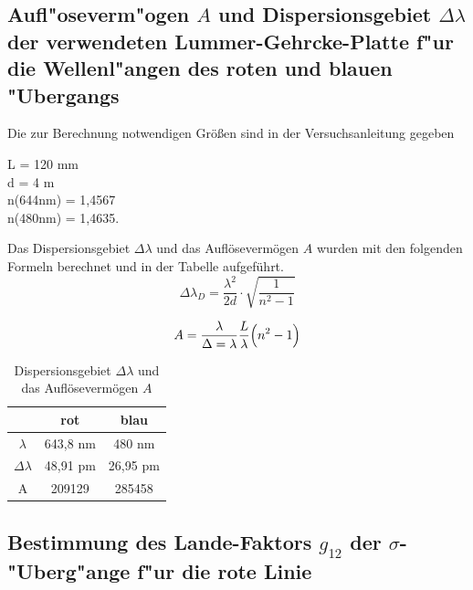   \subsection{\texorpdfstring{Aufl"oseverm"ogen $A$ und Dispersionsgebiet $\Delta \lambda$ der verwendeten Lummer-Gehrcke-Platte f"ur die Wellenl"angen des roten und blauen "Ubergangs}{Aufl"oseverm"ogen A und Dispersionsgebiet Delta lambda der verwendeten Lummer-Gehrcke-Platte f"ur die Wellenl"angen des roten und blauen "Ubergangs}}
  
  Die zur Berechnung notwendigen Größen sind in der Versuchsanleitung gegeben
  
  \begin{center}
  L = 120 mm \\
  d = 4 m \\
  n(644nm) = 1,4567 \\
  n(480nm) = 1,4635. \\
  \end{center}
Das Dispersionsgebiet $\Delta \lambda$ und das Auflösevermögen $A$ wurden mit den folgenden Formeln berechnet und in der Tabelle aufgeführt.
  \begin{equation}
\Delta \lambda_D=\frac{\lambda^2}{2d}\cdot \sqrt{\frac{1}{n^2-1}}
\end{equation}

\begin{equation}
A=\frac{\lambda}{\Delta = \lambda}\frac{L}{\lambda}\Bigl(n^2-1\Bigr)
\end{equation}

  
    \begin{table}[H] 
	\centering
	\caption{Dispersionsgebiet $\Delta \lambda$ und das Auflösevermögen $A$} 
	\begin{tabular}{c|c|c}

  & rot & blau\\ 
\hline 
$\lambda$	 		& 643,8 nm & 480 nm \\
$\Delta \lambda $	& 48,91 pm & 26,95 pm \\
A				& 209129 & 285458 \\

		
	\end{tabular} 
	  \label{tab:mit2}
\end{table} 
  \newpage
    \subsection{\texorpdfstring{Bestimmung des Lande-Faktors $g_{12}$ der $\sigma$-"Uberg"ange f"ur die rote Linie}{Bestimmung des Lande-Faktors g_{12} der sigma-"Uberg"ange f"ur die rote Linie}}
    
